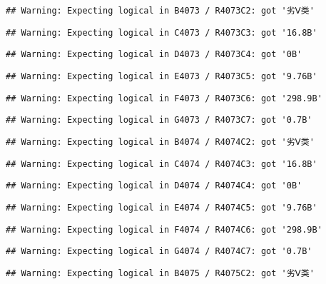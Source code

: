 \documentclass[
]{article}
\begin{document}
\begin{verbatim}
## Warning: Expecting logical in B4073 / R4073C2: got '劣Ⅴ类'
\end{verbatim}

\begin{verbatim}
## Warning: Expecting logical in C4073 / R4073C3: got '16.8B'
\end{verbatim}

\begin{verbatim}
## Warning: Expecting logical in D4073 / R4073C4: got '0B'
\end{verbatim}

\begin{verbatim}
## Warning: Expecting logical in E4073 / R4073C5: got '9.76B'
\end{verbatim}

\begin{verbatim}
## Warning: Expecting logical in F4073 / R4073C6: got '298.9B'
\end{verbatim}

\begin{verbatim}
## Warning: Expecting logical in G4073 / R4073C7: got '0.7B'
\end{verbatim}

\begin{verbatim}
## Warning: Expecting logical in B4074 / R4074C2: got '劣Ⅴ类'
\end{verbatim}

\begin{verbatim}
## Warning: Expecting logical in C4074 / R4074C3: got '16.8B'
\end{verbatim}

\begin{verbatim}
## Warning: Expecting logical in D4074 / R4074C4: got '0B'
\end{verbatim}

\begin{verbatim}
## Warning: Expecting logical in E4074 / R4074C5: got '9.76B'
\end{verbatim}

\begin{verbatim}
## Warning: Expecting logical in F4074 / R4074C6: got '298.9B'
\end{verbatim}

\begin{verbatim}
## Warning: Expecting logical in G4074 / R4074C7: got '0.7B'
\end{verbatim}

\begin{verbatim}
## Warning: Expecting logical in B4075 / R4075C2: got '劣Ⅴ类'
\end{verbatim}
\end{document}
